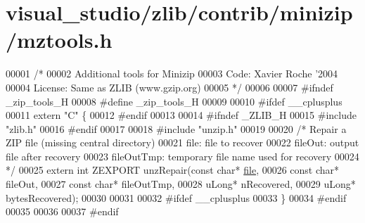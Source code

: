 \hypertarget{visual__studio_2zlib_2contrib_2minizip_2mztools_8h_source}{}\section{visual\+\_\+studio/zlib/contrib/minizip/mztools.h}
\label{visual__studio_2zlib_2contrib_2minizip_2mztools_8h_source}

\begin{DoxyCode}
00001 \textcolor{comment}{/*}
00002 \textcolor{comment}{  Additional tools for Minizip}
00003 \textcolor{comment}{  Code: Xavier Roche '2004}
00004 \textcolor{comment}{  License: Same as ZLIB (www.gzip.org)}
00005 \textcolor{comment}{*/}
00006 
00007 \textcolor{preprocessor}{#ifndef \_zip\_tools\_H}
00008 \textcolor{preprocessor}{#define \_zip\_tools\_H}
00009 
00010 \textcolor{preprocessor}{#ifdef \_\_cplusplus}
00011 \textcolor{keyword}{extern} \textcolor{stringliteral}{"C"} \{
00012 \textcolor{preprocessor}{#endif}
00013 
00014 \textcolor{preprocessor}{#ifndef \_ZLIB\_H}
00015 \textcolor{preprocessor}{#include "zlib.h"}
00016 \textcolor{preprocessor}{#endif}
00017 
00018 \textcolor{preprocessor}{#include "unzip.h"}
00019 
00020 \textcolor{comment}{/* Repair a ZIP file (missing central directory)}
00021 \textcolor{comment}{   file: file to recover}
00022 \textcolor{comment}{   fileOut: output file after recovery}
00023 \textcolor{comment}{   fileOutTmp: temporary file name used for recovery}
00024 \textcolor{comment}{*/}
00025 \textcolor{keyword}{extern} \textcolor{keywordtype}{int} ZEXPORT unzRepair(\textcolor{keyword}{const} \textcolor{keywordtype}{char}* \hyperlink{structfile}{file},
00026                              \textcolor{keyword}{const} \textcolor{keywordtype}{char}* fileOut,
00027                              \textcolor{keyword}{const} \textcolor{keywordtype}{char}* fileOutTmp,
00028                              uLong* nRecovered,
00029                              uLong* bytesRecovered);
00030 
00031 
00032 \textcolor{preprocessor}{#ifdef \_\_cplusplus}
00033 \}
00034 \textcolor{preprocessor}{#endif}
00035 
00036 
00037 \textcolor{preprocessor}{#endif}
\end{DoxyCode}
